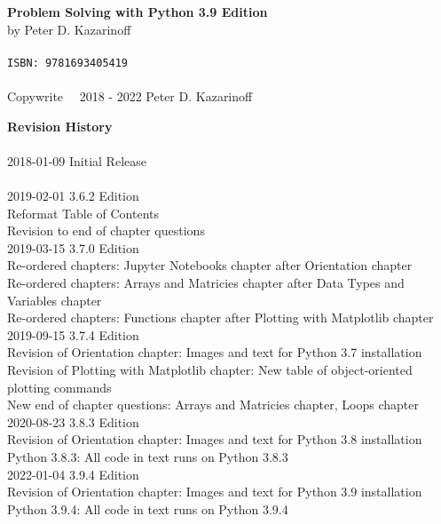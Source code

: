 
\textbf{Problem Solving with Python 3.9 Edition} \\
by Peter D. Kazarinoff \\
\\
\texttt{ISBN: 9781693405419} \\
\\
Copywrite \  \textcopyright \  2018 - 2022 Peter D. Kazarinoff\\

\vspace{3in}

\textbf{Revision History}\\
\\
2018-01-09 Initial Release\\
\\
2019-02-01 3.6.2 Edition\\
Reformat Table of Contents\\
Revision to end of chapter questions\\

2019-03-15 3.7.0 Edition \\
Re-ordered chapters: Jupyter Notebooks chapter after Orientation chapter \\
Re-ordered chapters: Arrays and Matricies chapter after Data Types and Variables chapter \\
Re-ordered chapters: Functions chapter after Plotting with Matplotlib chapter \\

2019-09-15 3.7.4 Edition \\
Revision of Orientation chapter: Images and text for Python 3.7 installation \\
Revision of Plotting with Matplotlib chapter: New table of object-oriented plotting commands \\
New end of chapter questions: Arrays and Matricies chapter, Loops chapter \\

2020-08-23 3.8.3 Edition \\
Revision of Orientation chapter: Images and text for Python 3.8 installation \\
Python 3.8.3: All code in text runs on Python 3.8.3 \\

2022-01-04 3.9.4 Edition \\
Revision of Orientation chapter: Images and text for Python 3.9 installation \\
Python 3.9.4: All code in text runs on Python 3.9.4 \\
